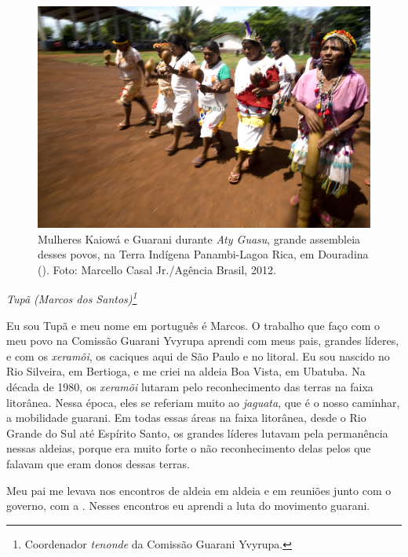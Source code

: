 \begin{figure}
  \centering
 \includegraphics[width=\textwidth]{./img/GUARANIS-img1.jpg}	
  \hfill
  \caption{Mulheres Kaiowá e Guarani durante \emph{Aty Guasu}, grande assembleia desses
povos, na Terra Indígena Panambi-Lagoa Rica, em Douradina (). Foto:
Marcello Casal Jr./Agência Brasil, 2012.}
\end{figure}


 

\begin{flushright}
\emph{Tupã (Marcos dos Santos)\footnote{Coordenador \emph{tenonde} da Comissão
Guarani Yvyrupa.}}
\end{flushright}
\medskip

Eu sou Tupã e meu nome em português é Marcos. O trabalho que faço com o
meu povo na Comissão Guarani Yvyrupa aprendi com meus pais, grandes
líderes, e com os \emph{xeramõi}, os caciques aqui de São Paulo e no litoral.
Eu sou nascido no Rio Silveira, em Bertioga, e me criei na aldeia Boa
Vista, em Ubatuba. Na década de 1980, os \emph{xeramõi} lutaram pelo
reconhecimento das terras na faixa litorânea. Nessa época, eles se
referiam muito ao \emph{jaguata}, que é o nosso caminhar, a mobilidade
guarani. Em todas essas áreas na faixa litorânea, desde o Rio Grande do
Sul até Espírito Santo, os grandes líderes lutavam pela permanência
nessas aldeias, porque era muito forte o não reconhecimento delas pelos
que falavam que eram donos dessas terras. 

Meu pai me levava nos encontros de aldeia em aldeia e em reuniões junto
com o governo, com a . Nesses encontros eu aprendi a luta do
movimento guarani. 

